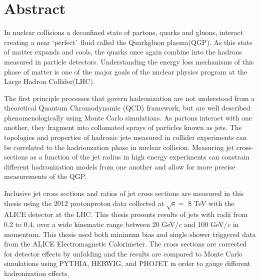 \chapter*{Abstract}\label{ch:abstract}
In nuclear collisions a deconfined state of partons, quarks and gluons, interact creating a near \lq perfect\rq \, fluid called the Quark\textendash gluon plasma(QGP).  As this state of matter expands and cools, the quarks once again combine into the hadrons measured in particle detectors.  Understanding the energy loss mechanisms of this phase of matter is one of the major goals of the nuclear physics program at the Large Hadron Collider(LHC).  

The first principle processes that govern hadronization are not understood from a theoretical Quantum Chromodynamic (QCD) framework, but are well described phenomenologically using Monte Carlo simulations.  
As partons interact with one another, they fragment into collomated sprays of particles known as jets.  The topologies and properties of hadronic jets measured in collider experiments can be correlated to the hadrionzation phase in nuclear collision.   Measuring  jet cross-sections as a function of the jet radius in high energy experiments can constrain different hadronization models from one another and allow for more precise measurements of the QGP.

Inclusive jet cross sections and ratios of jet cross sections are measured in this thesis using the 2012 proton\textendash proton data collected at $ \sqrt{ \mathrm{s} } = $ 8 TeV with the ALICE detector at the LHC.  This thesis presents results of jets with radii from 0.2 to 0.4, over a wide kinematic range between 20 GeV/\textit{c} and 100 GeV/\textit{c} in momentum.  This thesis used both minimum bias and single shower triggered data from the ALICE Electromagnetic Calorimeter.  The cross sections are corrected for detector effects by unfolding and the results are compared to Monte Carlo simulations using PYTHIA, HERWIG, and PHOJET in order to gauge different hadronization effects.